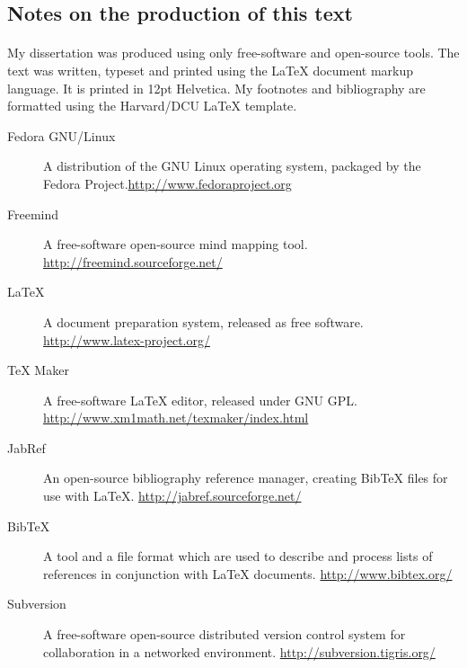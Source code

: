 \newpage
\singlespacing
\cleardoublepage
{}

\begin{appendices}
\section{Notes on the production of this text}
\paragraph{}My dissertation was produced using only free-software and open-source tools. The text was written, typeset and printed using the LaTeX document markup language. It is printed in 12pt Helvetica. My footnotes and bibliography are formatted using the Harvard/DCU LaTeX template.
\begin{description}
\item[Fedora GNU/Linux]{A distribution of the GNU Linux operating system, packaged by the Fedora Project.\newline\url{http://www.fedoraproject.org}}
\item[Freemind]{A free-software open-source mind mapping tool. \newline\url{http://freemind.sourceforge.net/}}
\item[LaTeX]{A document preparation system, released as free software. \newline\url{http://www.latex-project.org/}}
\item[TeX Maker]{A free-software LaTeX editor, released under GNU GPL. \newline\url{http://www.xm1math.net/texmaker/index.html}}
\item[JabRef]{An open-source bibliography reference manager, creating BibTeX files for use with LaTeX. \newline\url{http://jabref.sourceforge.net/}}
\item[BibTeX]{A tool and a file format which are used to describe and process lists of references in conjunction with LaTeX documents. \newline\url{http://www.bibtex.org/}}
\item[Subversion]{A free-software open-source distributed version control system for collaboration in a networked environment. \newline\url{http://subversion.tigris.org/}}
\end{description}
\newpage

\end{appendices}
